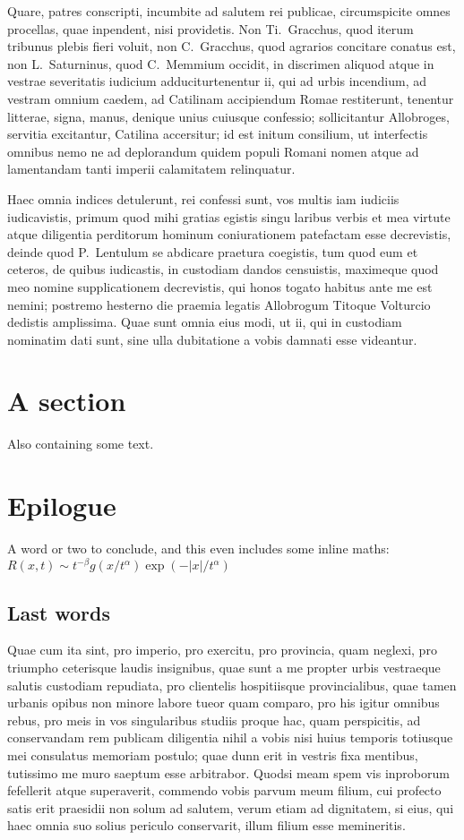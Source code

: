 \documentclass[12pt, a4paper, twoside]{article}
\begin{document}
	Quare, patres conscripti, incumbite ad salutem rei publicae,
	circumspicite omnes procellas, quae inpendent, nisi providetis. Non
	Ti.~Gracchus, quod iterum tribunus plebis fieri voluit, non
	C.~Gracchus, quod agrarios concitare conatus est, non L.~Saturninus,
	quod C.~Memmium occidit, in discrimen aliquod atque in vestrae
	severitatis iudicium adduciturtenentur ii, qui ad urbis incendium, ad
	vestram omnium caedem, ad Catilinam accipiendum Romae restiterunt,
	tenentur litterae, signa, manus, denique unius cuiusque confessio;
	sollicitantur Allobroges, servitia excitantur, Catilina accersitur; id
	est initum consilium, ut interfectis omnibus nemo ne ad deplorandum
	quidem populi Romani nomen atque ad lamentandam tanti imperii
	calamitatem relinquatur.
	
	Haec omnia indices detulerunt, rei confessi sunt, vos multis iam iudiciis
	iudicavistis, primum quod mihi gratias egistis singu laribus verbis et
	mea virtute atque diligentia perditorum hominum coniurationem patefactam
	esse decrevistis, deinde quod P.~Lentulum se abdicare praetura
	coegistis, tum quod eum et ceteros, de quibus iudicastis, in custodiam
	dandos censuistis, maximeque quod meo nomine supplicationem decrevistis,
	qui honos togato habitus ante me est nemini; postremo hesterno die
	praemia legatis Allobrogum Titoque Volturcio dedistis amplissima. Quae
	sunt omnia eius modi, ut ii, qui in custodiam nominatim dati sunt, sine
	ulla dubitatione a vobis damnati esse videantur.
	

	\section{A section}
	Also containing some text.
	
	
	\section{Epilogue}
	A word or two to conclude,  and this even includes some
	inline maths: $R(x,t)\sim
	t^{-\beta}g(x/t^\alpha)\exp(-|x|/t^\alpha)$
	
	\subsection{Last words}
	Quae cum ita sint, pro imperio, pro exercitu, pro provincia, quam
	neglexi, pro triumpho ceterisque laudis insignibus, quae sunt a me
	propter urbis vestraeque salutis custodiam repudiata, pro clientelis
	hospitiisque provincialibus, quae tamen urbanis opibus non minore labore
	tueor quam comparo, pro his igitur omnibus rebus, pro meis in vos
	singularibus studiis proque hac, quam perspicitis, ad conservandam rem
	publicam diligentia nihil a vobis nisi huius temporis totiusque mei
	consulatus memoriam postulo; quae dunn erit in vestris fixa mentibus,
	tutissimo me muro saeptum esse arbitrabor. Quodsi meam spem vis
	inproborum fefellerit atque superaverit, commendo vobis parvum meum
	filium, cui profecto satis erit praesidii non solum ad salutem, verum
	etiam ad dignitatem, si eius, qui haec omnia suo solius periculo
	conservarit, illum filium esse memineritis.
	
\end{document}
